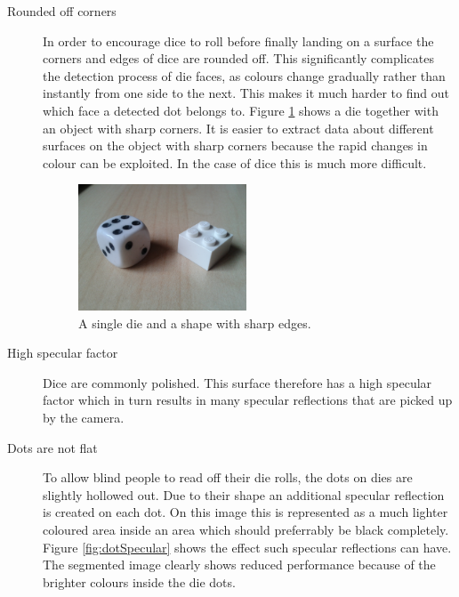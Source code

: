 \begin{description}
\item[Rounded off corners] In order to encourage dice to roll before finally landing on a surface the corners and edges of dice are rounded off. This significantly complicates the detection process of die faces, as colours change gradually rather than instantly from one side to the next. This makes it much harder to find out which face a detected dot belongs to. Figure \ref{fig:diesEdges} shows a die together with an object with sharp corners. It is easier to extract data about different surfaces on the object with sharp corners because the rapid changes in colour can be exploited. In the case of dice this is much more difficult.

\begin{figure}
	\centering
	\includegraphics[width=50mm]{images/dies/edges.jpg}
	\caption{A single die and a shape with sharp edges.}
	\label{fig:diesEdges}
\end{figure}

\item[High specular factor] Dice are commonly polished. This surface therefore has a high specular factor which in turn results in many specular reflections that are picked up by the camera. 
\item[Dots are not flat] To allow blind people to read off their die rolls, the dots on dies are slightly hollowed out. Due to their shape an additional specular reflection is created on each dot. On this image this is represented as a much lighter coloured area inside an area which should preferrably be black completely. Figure \ref{fig:dotSpecular} shows the effect such specular reflections can have. The segmented image clearly shows reduced performance because of the brighter colours inside the die dots.


\end{description}
